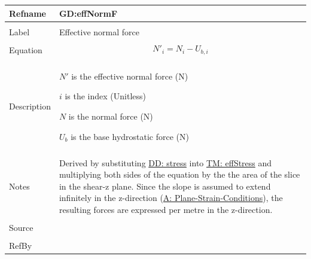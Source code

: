 \documentclass[12pt]{article}
\begin{document}
 \noindent \begin{minipage}{\textwidth}
\begin{tabular}{p{} p{}}
\toprule \textbf{Refname} & \textbf{GD:effNormF}
\label{GD:effNormF}
\\ \midrule \\
Label & Effective normal force
        \\ \midrule \\
        Equation & \begin{dmath}
                   {N'}_{i}=N_{i}-{U_{b,i}}
                   \end{dmath}
                   \\ \midrule \\
                   Description & \begin{symbDescription}
                                 \item{$N'$ is the effective normal force (N)}
                                 \item{$i$ is the index (Unitless)}
                                 \item{$N$ is the normal force (N)}
                                 \item{${U_{b}}$ is the base hydrostatic force (N)}
                                 \end{symbDescription}
                                 \\ \midrule \\
                                 Notes & Derived by substituting \hyperref[DD:stress]{DD: stress} into \hyperref[TM:effStress]{TM: effStress} and multiplying both sides of the equation by the the area of the slice in the shear-z plane. Since the slope is assumed to extend infinitely in the z-direction (\hyperref[A:Plane-Strain-Conditions]{A: Plane-Strain-Conditions}), the resulting forces are expressed per metre in the z-direction.
                                         \\ \midrule \\
                                         Source & \cite{chen2005}
                                                  \\ \midrule \\
                                                  RefBy & 
\\ \bottomrule \end{tabular}
\end{minipage}\\
\end{document}
